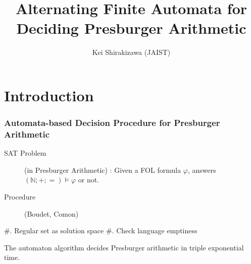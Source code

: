 \documentclass[t]{beamer}
\begin{document}
\title[Alternating Finite Automata for Deciding Presburger Arithmetic]{Alternating Finite Automata for Deciding Presburger Arithmetic%
  \label{alternating-finite-automata-for-deciding-presburger-arithmetic}}
\author[Kei Shirakizawa (JAIST)]{Kei Shirakizawa (JAIST)}
\date{}
\maketitle



\section{Introduction%
  \label{introduction}%
}

\begin{frame}[fragile]
\frametitle{Automata-based Decision Procedure for Presburger Arithmetic}


\begin{description}
\item[{SAT Problem}] \leavevmode 
(in Presburger Arithmetic) : Given a FOL formula  $\varphi$, answers $(\mathbb{N}; + ; =) \models \varphi$ or not.

\item[{Procedure}] \leavevmode 
(Boudet, Comon)

\end{description}


#. Regular set as solution space
#. Check language emptiness

\begin{theorem}
    The automaton algorithm decides Presburger arithmetic in triple
    exponential time.
\end{theorem}

\end{frame}
\end{document}
